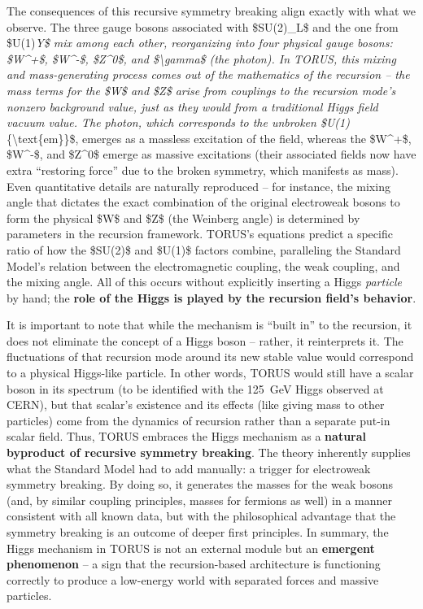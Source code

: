 \documentclass[
]{article}
\begin{document}
The consequences of this recursive symmetry breaking align exactly with
what we observe. The three gauge bosons associated with \$SU(2)\_L\$ and
the one from \$U(1)\emph{Y\$ mix among each other, reorganizing into
four physical gauge bosons: \$W\^{}+\$, \$W\^{}-\$, \$Z\^{}0\$, and
\$\textbackslash gamma\$ (the photon)\hspace{0pt}. In TORUS, this mixing
and mass-generating process comes out of the mathematics of the
recursion -- the mass terms for the \$W\$ and \$Z\$ arise from couplings
to the recursion mode's nonzero background value, just as they would
from a traditional Higgs field vacuum value. The photon, which
corresponds to the unbroken \$U(1)}\{\textbackslash text\{em\}\}\$,
emerges as a massless excitation of the field, whereas the \$W\^{}+\$,
\$W\^{}-\$, and \$Z\^{}0\$ emerge as massive excitations (their
associated fields now have extra ``restoring force'' due to the broken
symmetry, which manifests as mass)\hspace{0pt}. Even quantitative
details are naturally reproduced -- for instance, the mixing angle that
dictates the exact combination of the original electroweak bosons to
form the physical \$W\$ and \$Z\$ (the Weinberg angle) is determined by
parameters in the recursion framework\hspace{0pt}. TORUS's equations
predict a specific ratio of how the \$SU(2)\$ and \$U(1)\$ factors
combine, paralleling the Standard Model's relation between the
electromagnetic coupling, the weak coupling, and the mixing
angle\hspace{0pt}. All of this occurs without explicitly inserting a
Higgs \emph{particle} by hand; the \textbf{role of the Higgs is played
by the recursion field's behavior}.

It is important to note that while the mechanism is ``built in'' to the
recursion, it does not eliminate the concept of a Higgs boson -- rather,
it reinterprets it. The fluctuations of that recursion mode around its
new stable value would correspond to a physical Higgs-like particle. In
other words, TORUS would still have a scalar boson in its spectrum (to
be identified with the 125~GeV Higgs observed at CERN), but that
scalar's existence and its effects (like giving mass to other particles)
come from the dynamics of recursion rather than a separate put-in scalar
field. Thus, TORUS embraces the Higgs mechanism as a \textbf{natural
byproduct of recursive symmetry breaking}\hspace{0pt}. The theory
inherently supplies what the Standard Model had to add manually: a
trigger for electroweak symmetry breaking. By doing so, it generates the
masses for the weak bosons (and, by similar coupling principles, masses
for fermions as well) in a manner consistent with all known data, but
with the philosophical advantage that the symmetry breaking is an
outcome of deeper first principles. In summary, the Higgs mechanism in
TORUS is not an external module but an \textbf{emergent phenomenon} -- a
sign that the recursion-based architecture is functioning correctly to
produce a low-energy world with separated forces and massive particles.
\end{document}
